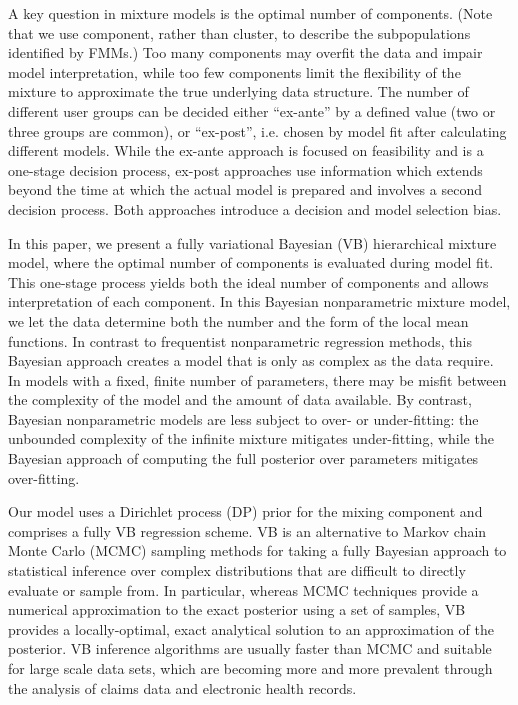 \documentclass[a4paper,UKenglish]{oasics-v2016}
\begin{document}
A key question in mixture models is the optimal number of components. (Note that we use component, rather than cluster, to describe the subpopulations identified by FMMs.) Too many components may overfit the data and impair model interpretation, while too few components limit the flexibility of the mixture to approximate the true underlying data structure.
The number of different user groups can be decided either ``ex-ante'' by a defined value (two or three groups are common), or ``ex-post'', i.e. chosen by model fit after calculating different models. 
While the ex-ante approach is focused on feasibility and is a one-stage decision process, ex-post approaches use information which extends beyond the time at which the actual model is prepared and involves a second decision process. Both approaches introduce a decision and model selection bias.

In this paper, we present a fully variational Bayesian (VB) hierarchical mixture model, where the optimal number of components is evaluated during model fit. This one-stage process yields both the ideal number of components and allows interpretation of each component. 
In this Bayesian nonparametric mixture model, we let the data determine both the number and the form of the local mean functions. In contrast to frequentist nonparametric regression methods, this Bayesian approach creates a model that is only as complex as the data require.~\cite{hannah} In models with a fixed, finite number of parameters, there may be misfit between the complexity of the model and the amount of data available. By contrast, Bayesian nonparametric models are less subject to over- or under-fitting: the unbounded complexity of the infinite mixture mitigates under-fitting, while the Bayesian approach of computing the full posterior over parameters mitigates over-fitting.~\cite{rasmussen}

Our model uses a Dirichlet process (DP) prior for the mixing component and comprises a fully VB regression scheme. VB is an alternative to Markov chain Monte Carlo (MCMC) sampling methods for taking a fully Bayesian approach to statistical inference over complex distributions that are difficult to directly evaluate or sample from. In particular, whereas MCMC techniques provide a numerical approximation to the exact posterior using a set of samples, VB provides a locally-optimal, exact analytical solution to an approximation of the posterior.
VB inference algorithms are usually faster than MCMC and suitable for large scale data sets, which are becoming more and more prevalent through the analysis of claims data and electronic health records.
\end{document}
